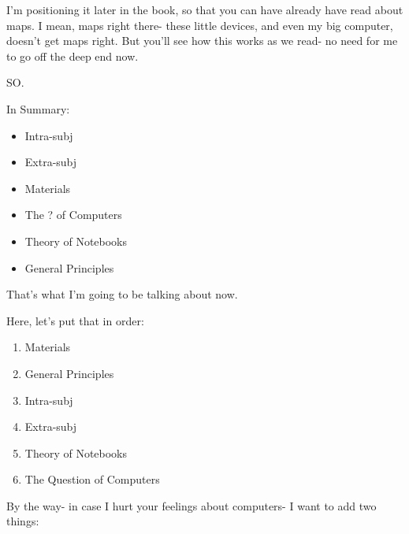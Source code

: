 \documentclass[oneside]{book}
\begin{document}
I'm positioning it later in the book, so that you can have already
have read about maps. I mean, maps right there- these little devices,
and even my big computer, doesn't get maps right. But you'll see how
this works as we read- no need for me to go off the deep end now.

SO.

In Summary:

\begin{itemize}
\item Intra-subj
\item Extra-subj
\item Materials
\item The ? of Computers
\item Theory of Notebooks
\item General Principles
\end{itemize}

That's what I'm going to be talking about now.

Here, let's put that in order:

\begin{enumerate}
\item Materials
\item General Principles
\item Intra-subj
\item Extra-subj
\item Theory of Notebooks
\item The Question of Computers
\end{enumerate}

By the way- in case I hurt your feelings about computers- I want to
add two things:
\end{document}
